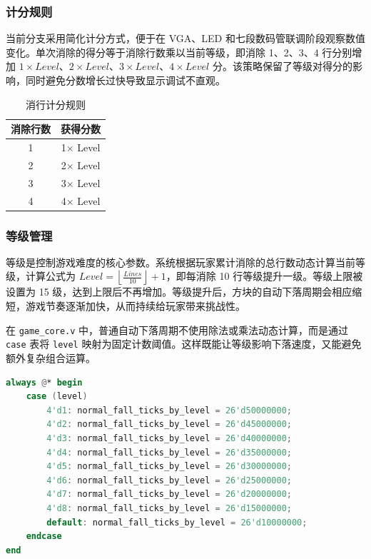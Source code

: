 \documentclass[UTF8,zihao=-4]{ctexart}
\begin{document}
\subsubsection{计分规则}
当前分支采用简化计分方式，便于在 VGA、LED 和七段数码管联调阶段观察数值变化。单次消除的得分等于消除行数乘以当前等级，即消除 1、2、3、4 行分别增加 $1\times Level$、$2\times Level$、$3\times Level$、$4\times Level$ 分。该策略保留了等级对得分的影响，同时避免分数增长过快导致显示调试不直观。

\begin{table}[H]
\centering
\begin{tabular}{cc}
\toprule
消除行数 & 获得分数 \\
\midrule
1 & 1$\times$ Level \\
2 & 2$\times$ Level \\
3 & 3$\times$ Level \\
4 & 4$\times$ Level \\
\bottomrule
\end{tabular}
\caption{消行计分规则}
\end{table}

\subsubsection{等级管理}
等级是控制游戏难度的核心参数。系统根据玩家累计消除的总行数动态计算当前等级，计算公式为 $Level=\left\lfloor \frac{Lines}{10}\right\rfloor+1$，即每消除 10 行等级提升一级。等级上限被设置为 15 级，达到上限后不再增加。等级提升后，方块的自动下落周期会相应缩短，游戏节奏逐渐加快，从而持续给玩家带来挑战性。

在 \texttt{game\_core.v} 中，普通自动下落周期不使用除法或乘法动态计算，而是通过 \texttt{case} 表将 \texttt{level} 映射为固定计数阈值。这样既能让等级影响下落速度，又能避免额外复杂组合运算。

\begin{lstlisting}[language=Verilog,caption={等级控制自动下落周期的关键逻辑},label={lst:level_speed}]
always @* begin
    case (level)
        4'd1: normal_fall_ticks_by_level = 26'd50000000;
        4'd2: normal_fall_ticks_by_level = 26'd45000000;
        4'd3: normal_fall_ticks_by_level = 26'd40000000;
        4'd4: normal_fall_ticks_by_level = 26'd35000000;
        4'd5: normal_fall_ticks_by_level = 26'd30000000;
        4'd6: normal_fall_ticks_by_level = 26'd25000000;
        4'd7: normal_fall_ticks_by_level = 26'd20000000;
        4'd8: normal_fall_ticks_by_level = 26'd15000000;
        default: normal_fall_ticks_by_level = 26'd10000000;
    endcase
end
\end{lstlisting}
\end{document}
